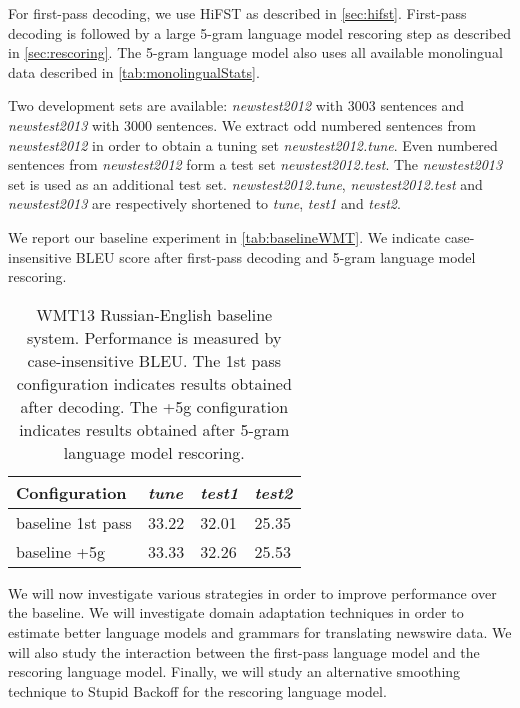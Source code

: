 For first-pass decoding, we use HiFST as described in \autoref{sec:hifst}. First-pass
decoding is followed by a large 5-gram language model rescoring step
as described in \autoref{sec:rescoring}. The 5-gram language model
also uses all available monolingual data described
in \autoref{tab:monolingualStats}.

Two development sets are available: \emph{newstest2012} with 3003 sentences and \emph{newstest2013} with
3000 sentences.
We extract odd numbered sentences from \emph{newstest2012} in order to
obtain a tuning set \emph{newstest2012.tune}. Even numbered sentences from \emph{newstest2012}
form a test set \emph{newstest2012.test}. The \emph{newstest2013} set is used as an additional test set.
\emph{newstest2012.tune}, \emph{newstest2012.test} and \emph{newstest2013} are respectively
shortened to \emph{tune}, \emph{test1} and \emph{test2}.

We report our baseline experiment
in \autoref{tab:baselineWMT}. We indicate case-insensitive BLEU
score after first-pass decoding and 5-gram language model rescoring.
%
\begin{table}
  \begin{center}
  \begin{tabular}{l|lll}
    Configuration & \emph{tune} & \emph{test1} & \emph{test2} \\
    \hline
    baseline 1st pass & 33.22 & 32.01 & 25.35 \\
    baseline +5g & 33.33 & 32.26 & 25.53 \\
  \end{tabular}
  \caption{WMT13 Russian-English baseline system. Performance is measured
    by case-insensitive BLEU. The 1st pass configuration indicates results obtained
    after decoding. The +5g configuration indicates results obtained
    after 5-gram language model rescoring.}
  \label{tab:baselineWMT}
  \end{center}
\end{table}
%
We will now investigate various strategies in order to improve
performance over the baseline. We will investigate
domain adaptation techniques in order to
estimate better language models and grammars for
translating newswire data.
We will also study the interaction between the first-pass language model
and the rescoring language model. Finally, we will study
an alternative smoothing technique to Stupid Backoff for the
rescoring language model.

